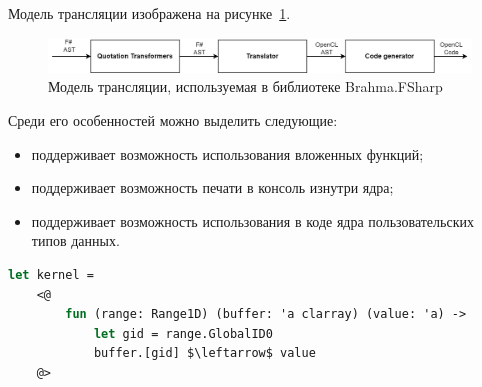 Модель трансляции изображена на рисунке~\ref{fig:transl}.
\begin{figure}[!h]
\centering
\includegraphics[scale=0.3]{pictures/Translator.png}
\caption{Модель трансляции, используемая в библиотеке Brahma.FSharp}
\label{fig:transl}
\end{figure}

Среди его особенностей можно выделить следующие:
\begin{itemize}
    \item поддерживает возможность использования вложенных функций;
    \item поддерживает возможность печати в консоль изнутри ядра;
    \item поддерживает возможность использования в коде ядра пользовательских типов данных. 
\end{itemize}

\begin{lstlisting}[caption=Пример описания простейшего ядра на языке F\#, language=Caml, frame=single, label={lst:ex}]
let kernel =
    <@
        fun (range: Range1D) (buffer: 'a clarray) (value: 'a) ->
            let gid = range.GlobalID0
            buffer.[gid] $\leftarrow$ value
    @>
\end{lstlisting}




